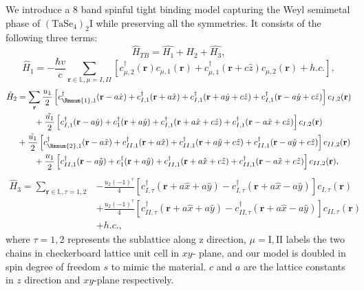We introduce a 8 band spinful tight binding model capturing the Weyl semimetal phase of $(\mathrm{TaSe}_4)_2\mathrm{I}$ while preserving all the symmetries. It consists of the following three terms: 
\begin{equation}
\hat{H}_{TB} =\hat{H_1}+\hat{H_2}+\hat{H_3} , \label{eq:TBmodel}
\end{equation}
\begin{equation}
    \hat{H}_1=-\frac{\hbar v}{c}\sum_{\mathbf{r}\in \mathbb{L},\mu=I,II}\left [ c_{\mu,2}^{\dagger}(\mathbf{r}) c_{\mu,1}(\mathbf{r}) + c_{\mu, 1}^{\dagger}(\mathbf{r}+c\hat{z}) c_{\mu,2}(\mathbf{r}) + h.c.\right ] ,
\end{equation}
\begin{align}
    \hat{H}_2 &=\sum_{\mathbf{r}} \frac{u_1}{2}\left[ c_{\Rmnum{1},1}^\dagger(\mathbf{r}-a\hat{x})+c_{I,1}^\dagger(\mathbf{r}+a\hat{x}) +c_{I,1}^\dagger(\mathbf{r}+a\hat{y}+c\hat{z})+c_{I,1}^\dagger(\mathbf{r}-a\hat{y}+c\hat{z})\right]c_{I,2}(\mathbf{r}) \nonumber \\ &\quad\quad+\frac{\tilde{u_1}}{2}\left[ c_{I,1}^\dagger(\mathbf{r}-a\hat{y})+c_1^\dagger(\mathbf{r}+a\hat{y})+c_{I,1}^\dagger(\mathbf{r}+a\hat{x}+c\hat{z})+c_{I,1}^\dagger(\mathbf{r}-a\hat{x}+c\hat{z}) \right]c_{I,2}(\mathbf{r}) \nonumber \\ &+\frac{\tilde{u_1}}{2}\left[ c_{\Rmnum{2},1}^\dagger(\mathbf{r}-a\hat{x})+c_{II,1}^\dagger(\mathbf{r}+a\hat{x}) +c_{II,1}^\dagger(\mathbf{r}+a\hat{y}+c\hat{z})+c_{II,1}^\dagger(\mathbf{r}-a\hat{y}+c\hat{z})\right]c_{II,2}(\mathbf{r}) \nonumber \\&\quad\quad+\frac{u_1}{2}\left[ c_{II,1}^\dagger(\mathbf{r}-a\hat{y})+c_1^\dagger(\mathbf{r}+a\hat{y})+c_{II,1}^\dagger(\mathbf{r}+a\hat{x}+c\hat{z})+c_{II,1}^\dagger(\mathbf{r}-a\hat{x}+c\hat{z}) \right]c_{II,2}(\mathbf{r}) , \label{H3tightbinding}
\end{align}
\begin{align}
    \hat{H}_3 =\sum_{\mathbf{r}\in\mathbb{L}, \tau=1,2} &-\frac{u_2 (-1)^{\tau}}{4} \left[ c^{\dagger}_{I,\tau}(\mathbf{r} + a \hat{x} + a \hat{y}) - c^{\dagger}_{I,\tau}(\mathbf{r} + a \hat{x} - a \hat{y}) \right] c_{I,  \tau}
(\mathbf{r}) \nonumber \\
&+\frac{u_2 (-1)^{\tau}}{4} \left[ c^{\dagger}_{II,\tau}(\mathbf{r} + a \hat{x} + a \hat{y}) - c^{\dagger}_{II,\tau}(\mathbf{r} + a \hat{x} - a \hat{y}) \right] c_{II,  \tau}
(\mathbf{r})\\
&+ h.c.  ,
\end{align}
where  $\tau = 1,2$ represents the sublattice along z direction, $\mu = \mathrm{I}, \mathrm{II}$ labels the two chains in checkerboard lattice unit cell in $xy$- plane, and our model is doubled in spin degree of freedom $s$ to mimic the material. $c$ and $a$ are the lattice constants in $z$ direction and $xy$-plane respectively. 

